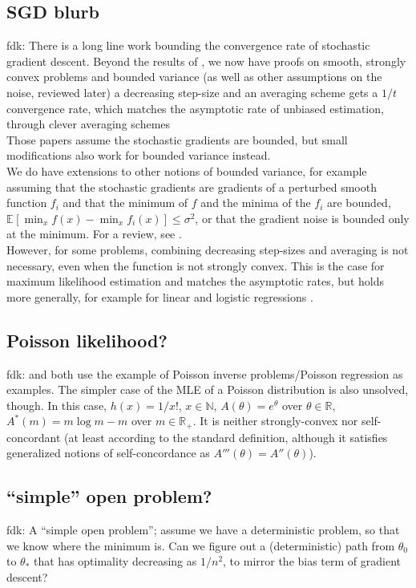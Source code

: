 \documentclass[twoside]{article}
\newcommand{\fdk}[1]{\textcolor{Periwinkle}{fdk:#1}}
\newcommand*{\expect}[2][]{\ensuremath{\mathbb{E}_{#1} \left[ #2 \right] }} %
\newcommand{\m}{m}
\begin{document}
\subsection{SGD blurb}
\fdk{
%
There is a long line work bounding the convergence rate of stochastic gradient descent.
Beyond the results of \citet{robbins1951stochastic},
we now have proofs on smooth, strongly convex problems and bounded variance
(as well as other assumptions on the noise, reviewed later)
a decreasing step-size and an averaging scheme gets
a $1/t$ convergence rate,
which matches the asymptotic rate of unbiased estimation,
through clever averaging schemes \citep{rakhlin2012making,lacostejulien2012simpler}
\\
Those papers assume the stochastic gradients are bounded,
but small modifications also work for bounded variance instead.
\\
We do have extensions to other notions of bounded variance,
for example assuming that the stochastic gradients are gradients of a perturbed smooth function $f_i$
and that the minimum of $f$ and the minima of the $f_i$
are bounded, $\expect{\min_x f(x) - \min_x f_i(x)} \leq \sigma^2$,
or that the gradient noise is bounded only at the minimum.
For a review, see \citet{gower2019sgd}.
\\
However, for some problems, combining decreasing step-sizes and averaging is not necessary,
even when the function is not strongly convex.
This is the case for maximum likelihood estimation and matches the asymptotic rates,
but holds more generally, for example for linear and logistic regressions \citep{bach2013nonstronglyconvex,moulines2011non}.
}


\subsection{Poisson likelihood?}
\fdk{
\citet{bauschke2017descent} and \citet{hanzely2018fastest} both use the example of Poisson inverse problems/Poisson regression
as examples.
The simpler case of the MLE of a Poisson distribution is also unsolved, though.
In this case, $h(x) = 1/x!$, $x \in \mathbb{N}$, $A(\theta) = e^\theta$ over $\theta \in \mathbb{R}$,
$A^*(\m) = \m \log \m - \m$ over $\m \in \mathbb{R}_+$.
It is neither strongly-convex nor self-concordant (at least according to the standard definition,
although it satisfies generalized notions of self-concordance as $A'''(\theta) = A''(\theta)$).
}

\subsection{``simple'' open problem?}
\fdk{
A ``simple open problem'';
assume we have a deterministic problem, so that we know where the minimum is.
Can we figure out a (deterministic) path from $\theta_0$ to $\theta_*$
that has optimality decreasing as $1/n^2$,
to mirror the bias term of gradient descent?
}
\end{document}
